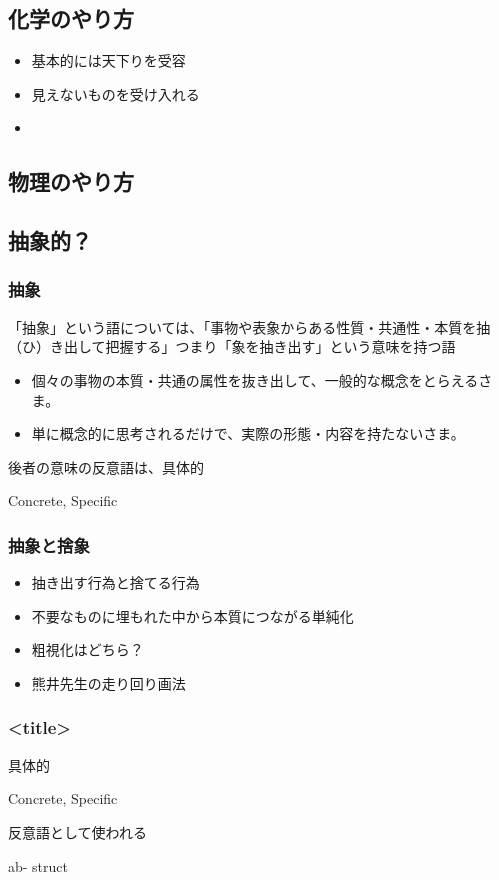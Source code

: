 \documentclass[12pt, dvipdfmx]{beamer}
\begin{document}
\subsection{化学のやり方}
    \begin{itemize}
        \item 基本的には天下りを受容
        \item 見えないものを受け入れる
        \item 
    \end{itemize}
\subsection{物理のやり方}



\subsection{抽象的？}


\begin{frame}
    \frametitle{抽象}

    「抽象」という語については、「事物や表象からある性質・共通性・本質を抽（ひ）き出して把握する」つまり「象を抽き出す」という意味を持つ語


    \begin{itemize}
        \item 個々の事物の本質・共通の属性を抜き出して、一般的な概念をとらえるさま。
        \item 単に概念的に思考されるだけで、実際の形態・内容を持たないさま。
    \end{itemize}

    後者の意味の反意語は、具体的

    Concrete, Specific

\end{frame}

\begin{frame}
    \frametitle{抽象と捨象}
    \begin{itemize}
        \item 抽き出す行為と捨てる行為
        \item 不要なものに埋もれた中から本質につながる単純化
        \item 粗視化はどちら？
        \item 熊井先生の走り回り画法
    \end{itemize}
\end{frame}


\begin{frame}
    \frametitle{<title>}

    具体的

    Concrete, Specific


    反意語として使われる

    ab-
    struct


\end{frame}
\end{document}
